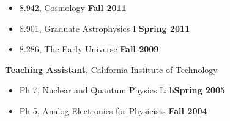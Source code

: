 \documentclass[margin,line]{res}
\begin{document}
\begin{resume}
\vspace*{.05in}
\begin{itemize}
\item[ ] 8.942, Cosmology \hfill {\bf Fall 2011}
\item[ ] 8.901, Graduate Astrophysics I \hfill {\bf Spring 2011}
\item[ ] 8.286, The Early Universe \hfill {\bf Fall 2009}
\end{itemize}
{\bf Teaching Assistant}, California Institute of Technology
\vspace*{.05in}
\begin{itemize}
\item[ ] Ph 7, Nuclear and Quantum Physics Lab\hfill {\bf Spring 2005}
\item[ ] Ph 5, Analog Electronics for Physicists \hfill {\bf Fall 2004}
\end{itemize}


\end{resume}
\end{document}
